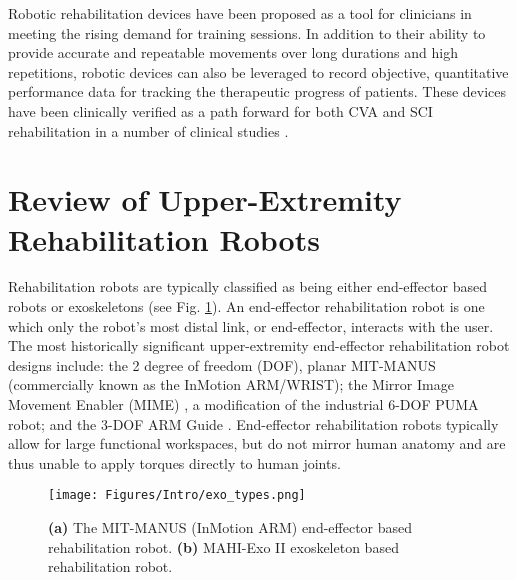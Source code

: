     Robotic rehabilitation devices have been proposed as a tool for clinicians in meeting the rising demand for training sessions. In addition to their ability to provide accurate and repeatable movements over long durations and high repetitions, robotic devices can also be leveraged to record objective, quantitative performance data for tracking the therapeutic progress of patients. These devices have been clinically verified as a path forward for both CVA and SCI rehabilitation in a number of clinical studies \cite{reinkensmeyer2000,krebs1998,charles2005,yozbatiran2011,yozbatiran2012,blank2014,lo2012,lum2005,lum2012}.




   \section{Review of Upper-Extremity Rehabilitation Robots} \label{sec:rehabrobotics}


   Rehabilitation robots are typically classified as being either end-effector based robots or exoskeletons (see Fig. \ref{fig:exo_types}). An end-effector rehabilitation robot is one which only the robot's most distal link, or end-effector, interacts with the user. The most historically significant upper-extremity end-effector rehabilitation robot designs include: the 2 degree of freedom (DOF), planar MIT-MANUS \cite{charles2005,krebs1998,krebs2007} (commercially known as the InMotion ARM/WRIST); the Mirror Image Movement Enabler (MIME) \cite{lum2006}, a modification of the industrial 6-DOF PUMA robot; and the 3-DOF ARM Guide \cite{reinkensmeyer2000}. End-effector rehabilitation robots typically allow for large functional workspaces, but do not mirror human anatomy and are thus unable to apply torques directly to human joints.

    \begin{figure}[!htb]
        \begin{center}
            \texttt{[image: Figures/Intro/exo\_types.png]}
            \caption{\textbf{(a)} The MIT-MANUS (InMotion ARM) end-effector based rehabilitation robot. \textbf{(b)} MAHI-Exo II exoskeleton based rehabilitation robot.}
            \label{fig:exo_types}
        \end{center}
        \vspace{-1.5em}
    \end{figure}

